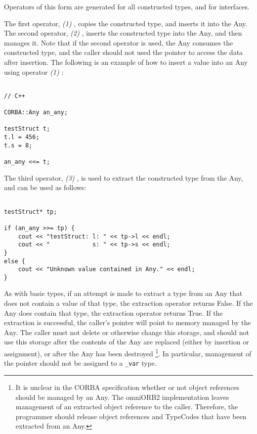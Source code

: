 \documentclass[11pt,twoside,onecolumn]{book}
\begin{document}
Operators of this form are generated for all constructed types, and for 
interfaces.

The first operator, {\em (1) }, copies the constructed type, and inserts it 
into the Any. The second operator, {\em (2) }, inserts the constructed type 
into the Any, and then manages it. Note that if the second operator is used,
the Any consumes the constructed type, and the caller should not used the
pointer to access the data after insertion. The following is an example of how
to insert a value into an Any using operator {\em (1) }:
{\small
\begin{verbatim}

// C++

CORBA::Any an_any;

testStruct t;
t.l = 456;
t.s = 8;

an_any <<= t;

\end{verbatim}
}


The third operator, {\em (3) }, is used to extract the constructed type 
from the Any, and can be used as follows:

{\small
\begin{verbatim}

testStruct* tp;

if (an_any >>= tp) {
    cout << "testStruct: l: " << tp->l << endl;
    cout << "            s: " << tp->s << endl;
}
else {
    cout << "Unknown value contained in Any." << endl;
}

\end{verbatim}
}

As with basic types, if an attempt is made to extract a type
from an Any that does not contain a value of that type, the extraction 
operator returns False. If the Any does contain that type, the extraction
operator returns True. If the extraction is successful, the caller's pointer 
will point to memory managed by the Any. The caller must not delete or 
otherwise change this storage, and should not use this storage after the
contents of the Any are replaced (either by insertion or assignment), or
after the Any has been destroyed \footnote{It is unclear in the CORBA 
specification whether or not object references should be managed by an Any. 
The omniORB2 implementation leaves management of an extracted object reference
to the caller. Therefore, the programmer should release object references and 
TypeCodes that have been extracted from an Any.}. In particular, management of
the pointer should not be assigned to a {\tt \_var} type.
\end{document}
